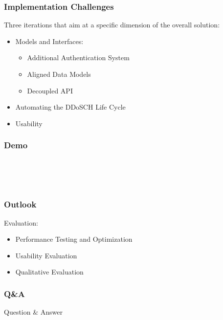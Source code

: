 \documentclass[fleqn]{beamer}
\begin{document}
    \begin{frame}
      \frametitle{Implementation Challenges}
      Three iterations that aim at a specific dimension of the overall solution:
      \begin{itemize}
          \item Models and Interfaces:
          \begin{itemize}
              \item Additional Authentication System
              \item Aligned Data Models
              \item Decoupled API
          \end{itemize}
          \item Automating the DDoSCH Life Cycle
          \item Usability
      \end{itemize}
      
    \end{frame}
    
    \begin{frame}
      \frametitle{Demo}
      \\
      \\
      \\
    \end{frame}
    
    \begin{frame}
    \frametitle{Outlook}
      Evaluation:
      \begin{itemize}
          \item Performance Testing and Optimization
          \item Usability Evaluation
          \item Qualitative Evaluation
      \end{itemize}
    \end{frame}
    
    \begin{frame}
    \frametitle{Q\&A}
    \begin{center}
        \Large Question \& Answer
    \end{center}
    \end{frame}
\end{document}
